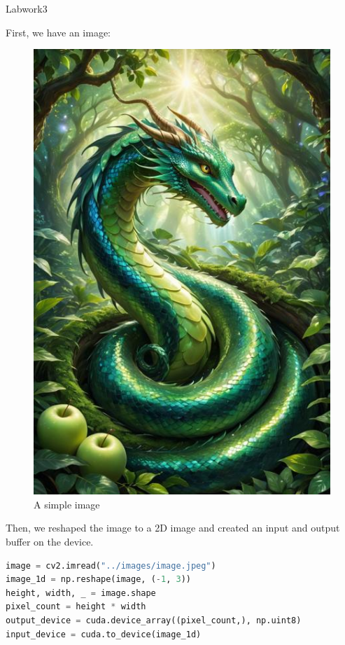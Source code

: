 \documentclass[12pt]{article}
\begin{document}
\begin{center}
    \vspace*{1.8cm}
    \Large
    Labwork3\\
\end{center}

\noindent
First, we have an image:
\begin{figure}[H]
\centering
    \includegraphics[height = 0.5\textheight, keepaspectratio]{images/image.jpeg}
    \caption{A simple image}
\end{figure}

\noindent
Then, we reshaped the image to a 2D image and created an input and output buffer on the device.

\begin{lstlisting}[language=Python]
image = cv2.imread("../images/image.jpeg")
image_1d = np.reshape(image, (-1, 3))
height, width, _ = image.shape
pixel_count = height * width
output_device = cuda.device_array((pixel_count,), np.uint8)
input_device = cuda.to_device(image_1d)
\end{lstlisting}
\end{document}
